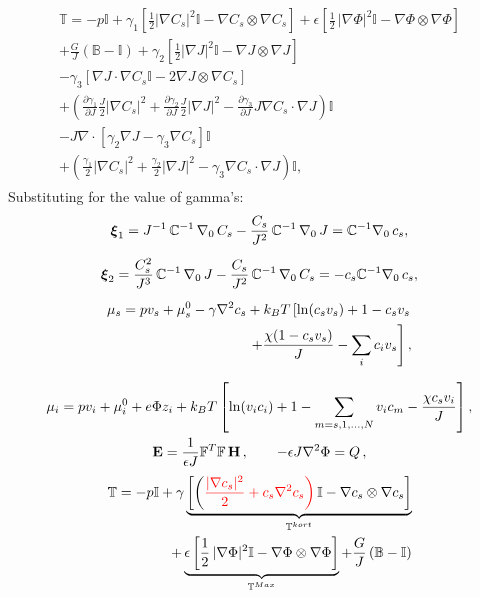 \begin{gather}
\begin{aligned}
\mathbb{T}= -p \mathbb{I} + \gamma_1 \left[\frac{1}{2} |\nabla C_s|^2\mathbb{I} - \nabla C_s \otimes \nabla C_s\right]+ \epsilon \left[\frac{1}{2} \,|\nabla \Phi|^2\mathbb{I} -\nabla \Phi \otimes \nabla \Phi\right]\\
+ \frac{G}{J}\left(\mathbb{B}-\mathbb{I}\right)
+\gamma_2 \left[\frac{1}{2} |\nabla J|^2\mathbb{I} - \nabla J \otimes \nabla J\right]\\
-\gamma_3 \left[ \nabla J\cdot\nabla C_s \mathbb{I} - 2\nabla J \otimes \nabla C_s\right]\\
+\left(\frac{\partial \gamma_1}{\partial J}\frac{J}{2}\left|\nabla C_s\right|^2+\frac{\partial \gamma_2}{\partial J}\frac{J}{2}\left|\nabla J\right|^2-\frac{\partial \gamma_3}{\partial J}J\nabla C_s\cdot \nabla J\right)\mathbb{I}\\
-J \nabla\cdot [\gamma_2 \nabla J- \gamma_3 \nabla C_s]\mathbb{I}
\\
+\left(\frac{\gamma_1}{2}\left|\nabla C_s\right|^2+\frac{\gamma_2}{2}\left|\nabla J\right|^2-\gamma_3\nabla C_s\cdot \nabla J\right)\mathbb{I},
\end{aligned}
\label{sys3}
\end{gather}
Substituting for the value of gamma's:
\begin{gather}
\boldsymbol{\xi}_1 =  J^{-1} \,\mathbb{C}^{-1} \,\nabla_0 \,C_s-\frac{C_s}{J^2}  \,\mathbb{C}^{-1}\,\nabla_0 \,J=\mathbb{C}^{-1}\nabla_0\,c_s,\\[2mm]
\boldsymbol{\xi}_2 = \frac{C^2_s}{J^3} \,\mathbb{C}^{-1} \,\nabla_0 \,J-\frac{C_s}{J^2}  \,\mathbb{C}^{-1} \,\nabla_0 \,C_s =-c_s\mathbb{C}^{-1}\nabla_0\,c_s,\\[2mm]
\begin{aligned}
\mu_s = p v_s + \mu_s^0 - \gamma\nabla^2c_s + k_BT\left[\ln (c_s v_s) +1 -c_sv_s\right.\\
\left.+ \frac{\chi(1-c_sv_s)}{J}-\sum_i c_iv_s\right], 
\end{aligned}\\[2.5mm]
\mu_i = p v_i + \mu^0_i + e\Phi z_i + k_BT \left[\ln (v_ic_i)+1-\sum_{m=s,1,\ldots,N}v_ic_m -\frac{\chi c_sv_i}{J} \right],\\
\mathbf{E} = \frac{1}{\epsilon J} \mathbb{F}^T \mathbb{F}\, \mathbf{H}\, , \qquad -\epsilon J \nabla^2 \Phi = Q\, ,
\end{gather}
\begin{gather}
\begin{aligned}
\mathbb{T}= -p \mathbb{I} +  \gamma\underbrace{\left[\left(\color{red}\frac{|\nabla c_s|^2}{2}+c_s\nabla^2c_s\right)\mathbb{I} - \nabla c_s \otimes \nabla c_s\right]}_{\mathbb{T}^{kort}}\\+ \underbrace{\epsilon \left[\frac{1}{2} \,|\nabla \Phi|^2\mathbb{I} -\nabla \Phi \otimes \nabla \Phi\right]}_{\mathbb{T}^{Max}}
+ \frac{G}{J}\left(\mathbb{B}-\mathbb{I}\right)
\end{aligned}
\end{gather}
